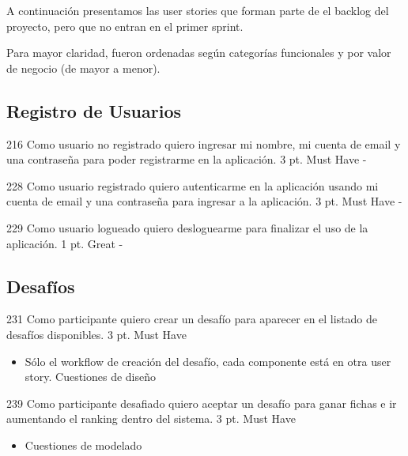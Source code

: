 A continuación presentamos las user stories que forman parte de el backlog del proyecto, pero que no entran en el primer sprint.

Para mayor claridad, fueron ordenadas según categorías funcionales y por valor de negocio (de mayor a menor).

\subsection{Registro de Usuarios}

\simplestory
{216}
{Como usuario no registrado quiero ingresar mi nombre, mi cuenta de email y una contraseña para poder registrarme en la aplicación.}
{3 pt.}
{Must Have}
{-}

\vspace{1cm}

\simplestory
{228}
{Como usuario registrado quiero autenticarme en la aplicación usando mi cuenta de email y una contraseña para ingresar a la aplicación.}
{3 pt.}
{Must Have}
{-}

\vspace{1cm}

\simplestory
{229}
{Como usuario logueado quiero desloguearme para finalizar el uso de la aplicación.}
{1 pt.}
{Great}
{-}

\vspace{1cm}

\subsection{Desaf\'ios}

\simplestory
{231}
{Como participante quiero crear un desafío para aparecer en el listado de desafíos disponibles.}
{3 pt.}
{Must Have}
{\begin{itemize}
\item Sólo el workflow de creación del desafío, cada componente está en otra user story.
Cuestiones de diseño
\end{itemize}}

\vspace{1cm}

\simplestory
{239}
{Como participante desafiado quiero aceptar un desafío para ganar fichas e ir aumentando el ranking dentro del sistema.}
{3 pt.}
{Must Have}
{\begin{itemize}
\item Cuestiones de modelado
\end{itemize}}

\vspace{1cm}

